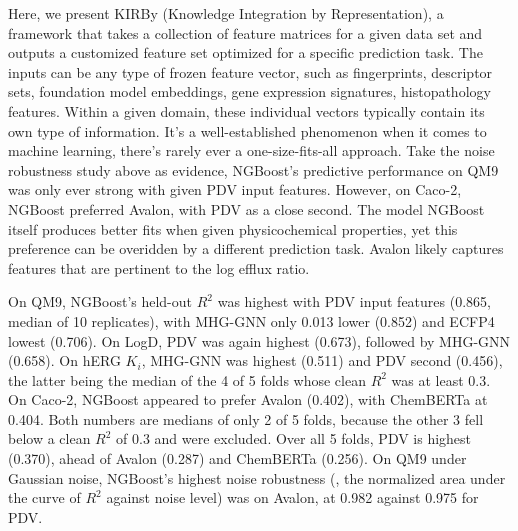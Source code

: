 Here, we present KIRBy (Knowledge Integration by Representation), a framework that takes a collection of feature matrices for a given data set and outputs a customized feature set optimized for a specific prediction task. The inputs can be any type of frozen feature vector, such as fingerprints, descriptor sets, foundation model embeddings, gene expression signatures, histopathology features. Within a given domain, these individual vectors typically contain its own type of information. It's a well-established phenomenon when it comes to machine learning, there's rarely ever a one-size-fits-all approach. Take the noise robustness study above as evidence, NGBoost's predictive performance on QM9 was only ever strong with given PDV input features. However, on Caco-2, NGBoost preferred Avalon, with PDV as a close second. The model NGBoost itself produces better fits when given physicochemical properties, yet this preference can be overidden by a different prediction task. Avalon likely captures features that are pertinent to the log efflux ratio.

On QM9, NGBoost's held-out $R^2$ was highest with PDV input features (0.865, median of 10 replicates), with MHG-GNN only 0.013 lower (0.852) and ECFP4 lowest (0.706). On LogD, PDV was again highest (0.673), followed by MHG-GNN (0.658). On hERG $K_i$, MHG-GNN was highest (0.511) and PDV second (0.456), the latter being the median of the 4 of 5 folds whose clean $R^2$ was at least 0.3. On Caco-2, NGBoost appeared to prefer Avalon (0.402), with ChemBERTa at 0.404. Both numbers are medians of only 2 of 5 folds, because the other 3 fell below a clean $R^2$ of 0.3 and were excluded. Over all 5 folds, PDV is highest (0.370), ahead of Avalon (0.287) and ChemBERTa (0.256).
On QM9 under Gaussian noise, NGBoost's highest noise robustness (\aucnorm, the normalized area under the curve of $R^2$ against noise level) was on Avalon, at 0.982 against 0.975 for PDV.

